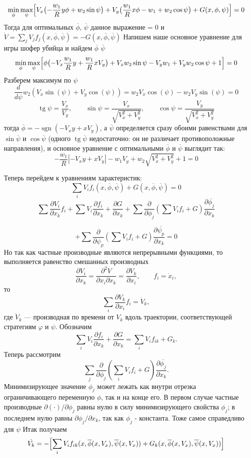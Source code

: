 \documentclass[14pt,a4paper]{extarticle}
\begin{document}
	\[\min_{\phi}\max_{\psi}\Bigl[V_{x}\bigl(-\frac{w_{1}}{R}y\phi + w_{2}\sin\psi\bigr) + V_{y}\bigl(\frac{w_{1}}{R}x\phi - w_{1} + w_{2}\cos\psi\bigr) + G(x, \phi, \psi)\Bigr]  = 0\]
	Тогда для оптимальных $\overline{\phi}$, $\overline{\psi}$ данное выражение = 0 и $\dot{V} = \sum_{j}V_{j}f_{j}(x, \overline{\phi}, \overline{\psi}) = -G(x, \overline{\phi}, \overline{\psi})$
	Напишем наше основное уравнение для игры шофер убийца и найдем $\overline{\phi}$ $\overline{\psi}$
	\[\min_{\phi}\max_{\psi} \Bigl[\phi\bigl(-V_{x}\frac{w_{1}}{R}y + \frac{w_{1}}{R}xV_{y}\bigr) + V_{x}w_{2}\sin\psi - V_{y}w_{1} + V_{y}w_{2}\cos\psi + 1\Bigr] = 0\]
	Разберем максимум по $\psi$
	\[\frac{d}{d\psi} w_{2}(V_{x}\sin(\psi) + V_{y}\cos(\psi)) = w_{2}V_{x}\cos(\psi) - w_{2}V_{y}\sin(\psi) = 0\]
	\[\operatorname{tg}\psi = \frac{V_{x}}{V_{y}},\qquad \sin\psi = \frac{V_{x}}{\sqrt{V_{x}^{2} + V_{y}^{2}}},\qquad \cos\psi = \frac{V_{y}}{\sqrt{V_{x}^{2} + V_{y}^{2}}}\]
	тогда $\overline{\phi} = -\operatorname{sgn}(-V_xy + xV_y)$, а $\overline{\psi}$ определяется сразу обоими равенствами для $\sin\overline{\psi}$ и $\cos\overline{\psi}$ (одного $\operatorname{tg}\overline{\psi}$ недостаточно: он не различает противоположные направления), и основное уравнение с оптимальными $\overline{\phi}$ и $\overline{\psi}$ выглядит так:
	\[-\frac{w_1}{R}|-V_xy + xV_y| -w_1V_y + w_2\sqrt{V_x^2 + V_y^2} + 1 = 0\]
	
	Теперь перейдем к уравнениям характеристик:
	\[\sum_{i}{V_if_i(x, \overline{\phi}, \overline{\psi})} + G(x, \overline{\phi}, \overline{\psi}) = 0\]
	\[
	\sum \frac{\partial V_i}{\partial x_k} f_i
	+ \sum V_i \frac{\partial f_i}{\partial x_k}
	+ \frac{\partial G}{\partial x_k}
	+ \sum \frac{\partial}{\partial \phi_j} \left( \sum V_i f_i + G \right) \frac{\partial \overline{\phi_j}}{\partial x_k}
	\]
	
	\[
	+ \sum \frac{\partial}{\partial \psi_p} \left( \sum V_i f_i + G \right) \frac{\partial \overline{\psi_p}}{\partial x_k} = 0\]
	Но так как частные производные являются непрерывными функциями, то выполняется равенство смешанных производных
	\[
	\frac{\partial V_i}{\partial x_k} = \frac{\partial^2 V}{\partial x_i \partial x_k} = \frac{\partial V_k}{\partial x_i}, \qquad f_i = \dot{x}_i,
	\]
	то
	\[
	\sum_i \frac{\partial V_k}{\partial x_i} f_i = \dot{V}_k,
	\]
	где \(\dot{V}_k\) — производная по времени от \(V_k\) вдоль траектории, соответствующей стратегиям \(\varphi\) и \(\psi\). Обозначим
	\[
	\sum_i V_i \frac{\partial f_i}{\partial x_k} + \frac{\partial G}{\partial x_k} = \sum_i V_i f_{ik} + G_k.
	\]
	Теперь рассмотрим
	\[
	\sum_j \frac{\partial}{\partial \phi_j} \left( \sum_i V_i f_i + G \right) \frac{\partial \overline{\phi_j}}{\partial x_k}.
	\]
	Минимизирующее значение \( \phi_j \) может лежать как внутри отрезка ограничивающего переменную $\phi$, так и на конце его. В первом случае частные производные \( \partial(\cdot)/\partial\phi_j \) равны нулю в силу минимизирующего свойства \( \phi_j \); в последнем нулю равны \( \partial\phi_j/\partial x_k \), так как \( \phi_j \) - константа. Тоже самое справедливо для $\psi$
	Итак получаем
	\[
	\dot{V_k} = -\Bigl[\sum_i V_i f_{ik}(x, \overline{\phi}(x, V_x), \overline{\psi}(x, V_x)) + G_k(x, \overline{\phi}(x, V_x), \overline{\psi}(x, V_x))\Bigr]
	\]
	
\end{document}
